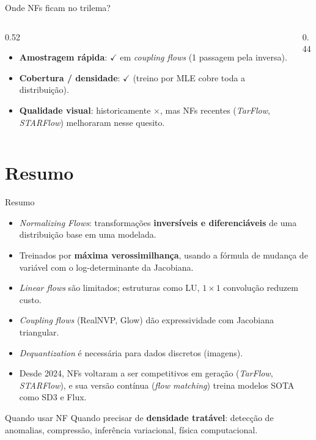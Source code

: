 \documentclass[aspectratio=169,xcolor=dvipsnames]{beamer}
\begin{document}
  \begin{frame}{Onde NFs ficam no trilema?}
    \begin{columns}[T]
      \begin{column}{0.52\textwidth}
        \begin{itemize}
          \item \textbf{Amostragem rápida}: $\checkmark$ em \textit{coupling flows} (1 passagem pela inversa).
          \item \textbf{Cobertura / densidade}: $\checkmark$
          (treino por MLE cobre toda a distribuição).
          \item \textbf{Qualidade visual}: historicamente $\times$, mas
          NFs recentes (\textit{TarFlow}, \textit{STARFlow}) melhoraram nesse quesito.
        \end{itemize}
      \end{column}
      \begin{column}{0.44\textwidth}
        \centering
        \resizebox{\linewidth}{!}{\generativetrilemma[vaenf]}
      \end{column}
    \end{columns}
  \end{frame}

  \section*{Resumo}

  \begin{frame}{Resumo}
    \begin{itemize}
      \item \textit{Normalizing Flows}: transformações \textbf{inversíveis
      e diferenciáveis} de uma distribuição base em uma modelada.
      \item Treinados por \textbf{máxima verossimilhança}, usando a
      fórmula de mudança de variável com o log-determinante da
      Jacobiana.
      \item \textit{Linear flows} são limitados; estruturas como LU,
      $1{\times}1$ convolução reduzem custo.
      \item \textit{Coupling flows} (RealNVP, Glow) dão expressividade
      com Jacobiana triangular.
      \item \textit{Dequantization} é necessária para dados discretos
      (imagens).
      \item Desde 2024, NFs voltaram a ser competitivos em geração
      (\textit{TarFlow}, \textit{STARFlow}), e sua versão contínua
      (\textit{flow matching}) treina modelos SOTA como SD3 e Flux.
    \end{itemize}
    \begin{block}{Quando usar NF}
      Quando precisar de \textbf{densidade tratável}: detecção de
      anomalias, compressão, inferência variacional, física
      computacional.
    \end{block}
  \end{frame}
\end{document}
